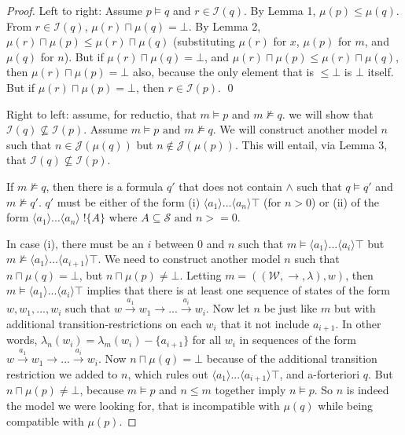 \documentclass[smallextended]{svjour3}       %
\numberwithin{subcase}{mycase}
\begin{document}
\begin{proof}

Left to right: Assume $p \models q$ and $r \in \mathcal{I}(q)$.
By Lemma 1, $\mu(p) \leq \mu(q)$.
From $r \in \mathcal{I}(q)$, $\mu(r) \sqcap \mu(q) = \bot$.
By Lemma 2, $\mu(r) \sqcap \mu(p) \leq \mu(r) \sqcap \mu(q)$ (substituting $\mu(r)$ for $x$, $\mu(p)$ for $m$, and $\mu(q)$ for $n$).
But if $\mu(r) \sqcap \mu(q) = \bot$, and $\mu(r) \sqcap \mu(p) \leq \mu(r) \sqcap \mu(q)$, then $\mu(r) \sqcap \mu(p) = \bot$ also, because the only element that is $\leq \bot$ is $\bot$ itself.
But if $\mu(r) \sqcap \mu(p) = \bot$, then $r \in \mathcal{I}(p)$.
\qed

Right to left: assume, for reductio, that $m \models p$ and $m \nvDash q$. we will show that $\mathcal{I}(q) \nsubseteq \mathcal{I}(p)$. 
Assume $m \models p \mbox{ and } m \nvDash q$. We will construct another model $n$ such that $n \in \mathcal{J}(\mu(q))$ but $n \notin \mathcal{J}(\mu(p))$.
This will entail, via Lemma 3, that $\mathcal{I}(q) \nsubseteq \mathcal{I}(p)$.

If $m \nvDash q$, then there is a formula $q'$ that does not contain $\land$ such that $q \models q'$ and $m \nvDash q'$. $q'$ must be either of the form (i) $\langle a_1 \rangle ... \langle a_n \rangle \top$ (for $n > 0$) or (ii) of the form $\langle a_1 \rangle ... \langle a_n \rangle \; !\{A\}$ where $A \subseteq \mathcal{S} \mbox{ and } n >= 0$.

In case (i), there must be an $i$ between $0$ and $n$ such that $m \models \langle a_1 \rangle ... \langle a_i \rangle \top$ but $m \nvDash  \langle a_1 \rangle ... \langle a_{i+1} \rangle \top$. We need to construct another model $n$ such that $n \sqcap \mu(q) = \bot$, but $n \sqcap \mu(p) \neq \bot$. Letting $m = ((\mathcal{W},\rightarrow,\lambda),w)$, then $m \models \langle a_1 \rangle ... \langle a_i \rangle \top$ implies that there is at least one sequence of states of the form $w, w_1, ..., w_i$ such that $w \xrightarrow{a_1} w_1 \rightarrow ... \xrightarrow{a_i} w_i$. 
Now let $n$ be just like $m$ but with additional transition-restrictions on each $w_i$ that it not include $a_{i+1}$. 
In other words, $\lambda_n(w_i) = \lambda_m(w_i)  - \{a_{i+1}\}$ for all $w_i$ in sequences of the form $w \xrightarrow{a_1} w_1 \rightarrow ... \xrightarrow{a_i} w_i$. Now $n \sqcap \mu(q) = \bot$ because of the additional transition restriction we added to $n$, which rules out $\langle a_1 \rangle ... \langle a_{i+1} \rangle \top$, and a-forteriori $q$. But $n \sqcap \mu(p) \neq \bot$, because $m \models p$ and $n \leq m$ together imply $n \models p$. So $n$ is indeed the model we were looking for, that is incompatible with $\mu(q)$ while being compatible with $\mu(p)$.


\end{proof}
\end{document}
